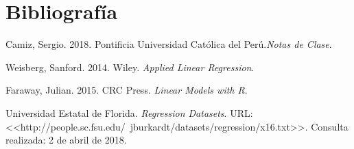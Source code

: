 \documentclass[a4paper,10pt]{article}\usepackage[]{graphicx}\usepackage[]{color}
\begin{document}
\section{Bibliografía}
Camiz, Sergio. 2018. Pontificia Universidad Católica del Perú.\emph{Notas de Clase}.

Weisberg, Sanford. 2014. Wiley. \emph{Applied Linear Regression}.

Faraway, Julian. 2015. CRC Press. \emph{Linear Models with R}.

Universidad Estatal de Florida. \emph{Regression Datasets}. URL: <<http://people.sc.fsu.edu/~jburkardt/datasets/regression/x16.txt>>. Consulta realizada: 2 de abril de 2018.
\end{document}
